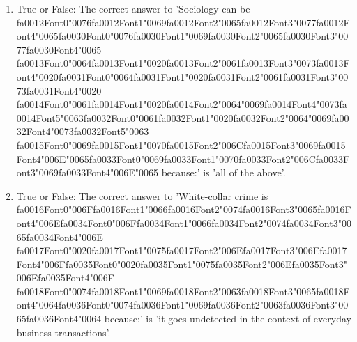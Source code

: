 \documentclass[12pt]{article}
\begin{document}
\begin{enumerate}[label=\arabic*.]
\item True or False: The correct answer to 'Sociology can be {\csname fa0012Font0\endcsname\char"0076}{\csname fa0012Font1\endcsname\char"0069}{\csname fa0012Font2\endcsname\char"0065}{\csname fa0012Font3\endcsname\char"0077}{\csname fa0012Font4\endcsname\char"0065}{\csname fa0030Font0\endcsname\char"0076}{\csname fa0030Font1\endcsname\char"0069}{\csname fa0030Font2\endcsname\char"0065}{\csname fa0030Font3\endcsname\char"0077}{\csname fa0030Font4\endcsname\char"0065} {\csname fa0013Font0\endcsname\char"0064}{\csname fa0013Font1\endcsname\char"0020}{\csname fa0013Font2\endcsname\char"0061}{\csname fa0013Font3\endcsname\char"0073}{\csname fa0013Font4\endcsname\char"0020}{\csname fa0031Font0\endcsname\char"0064}{\csname fa0031Font1\endcsname\char"0020}{\csname fa0031Font2\endcsname\char"0061}{\csname fa0031Font3\endcsname\char"0073}{\csname fa0031Font4\endcsname\char"0020} {\csname fa0014Font0\endcsname\char"0061}{\csname fa0014Font1\endcsname\char"0020}{\csname fa0014Font2\endcsname\char"0064}{\char"0069}{\csname fa0014Font4\endcsname\char"0073}{\csname fa0014Font5\endcsname\char"0063}{\csname fa0032Font0\endcsname\char"0061}{\csname fa0032Font1\endcsname\char"0020}{\csname fa0032Font2\endcsname\char"0064}{\char"0069}{\csname fa0032Font4\endcsname\char"0073}{\csname fa0032Font5\endcsname\char"0063} {\csname fa0015Font0\endcsname\char"0069}{\csname fa0015Font1\endcsname\char"0070}{\csname fa0015Font2\endcsname\char"006C}{\csname fa0015Font3\endcsname\char"0069}{\csname fa0015Font4\endcsname\char"006E}{\char"0065}{\csname fa0033Font0\endcsname\char"0069}{\csname fa0033Font1\endcsname\char"0070}{\csname fa0033Font2\endcsname\char"006C}{\csname fa0033Font3\endcsname\char"0069}{\csname fa0033Font4\endcsname\char"006E}{\char"0065} because:' is 'all of the above'.
\item True or False: The correct answer to 'White-collar crime is {\csname fa0016Font0\endcsname\char"006F}{\csname fa0016Font1\endcsname\char"0066}{\csname fa0016Font2\endcsname\char"0074}{\csname fa0016Font3\endcsname\char"0065}{\csname fa0016Font4\endcsname\char"006E}{\csname fa0034Font0\endcsname\char"006F}{\csname fa0034Font1\endcsname\char"0066}{\csname fa0034Font2\endcsname\char"0074}{\csname fa0034Font3\endcsname\char"0065}{\csname fa0034Font4\endcsname\char"006E} {\csname fa0017Font0\endcsname\char"0020}{\csname fa0017Font1\endcsname\char"0075}{\csname fa0017Font2\endcsname\char"006E}{\csname fa0017Font3\endcsname\char"006E}{\csname fa0017Font4\endcsname\char"006F}{\csname fa0035Font0\endcsname\char"0020}{\csname fa0035Font1\endcsname\char"0075}{\csname fa0035Font2\endcsname\char"006E}{\csname fa0035Font3\endcsname\char"006E}{\csname fa0035Font4\endcsname\char"006F} {\csname fa0018Font0\endcsname\char"0074}{\csname fa0018Font1\endcsname\char"0069}{\csname fa0018Font2\endcsname\char"0063}{\csname fa0018Font3\endcsname\char"0065}{\csname fa0018Font4\endcsname\char"0064}{\csname fa0036Font0\endcsname\char"0074}{\csname fa0036Font1\endcsname\char"0069}{\csname fa0036Font2\endcsname\char"0063}{\csname fa0036Font3\endcsname\char"0065}{\csname fa0036Font4\endcsname\char"0064} because:' is 'it goes undetected in the context of everyday business transactions'.

\end{enumerate}
\end{document}
